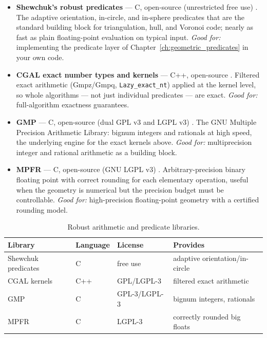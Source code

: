 \begin{itemize}
  \item \textbf{Shewchuk's robust predicates} --- C, open-source
    (unrestricted free use) \cite{shewchuk1997}. The adaptive
    orientation, in-circle, and in-sphere predicates that are the
    standard building block for triangulation, hull, and Voronoi code;
    nearly as fast as plain floating-point evaluation on typical input.
    \emph{Good for:} implementing the predicate layer of
    Chapter~\ref{ch:geometric_predicates} in your own code.
  \item \textbf{CGAL exact number types and kernels} --- C++, open-source
    \cite{cgalmanual}. Filtered exact arithmetic (Gmpz/Gmpq,
    \texttt{Lazy\_exact\_nt}) applied at the kernel level, so whole
    algorithms --- not just individual predicates --- are exact.
    \emph{Good for:} full-algorithm exactness guarantees.
  \item \textbf{GMP} --- C, open-source (dual GPL v3 and LGPL v3)
    \cite{gmp}. The GNU Multiple Precision Arithmetic Library: bignum
    integers and rationals at high speed, the underlying engine for the
    exact kernels above. \emph{Good for:} multiprecision integer and
    rational arithmetic as a building block.
  \item \textbf{MPFR} --- C, open-source (GNU LGPL v3) \cite{mpfr}.
    Arbitrary-precision binary floating point with correct rounding for
    each elementary operation, useful when the geometry is numerical but
    the precision budget must be controllable. \emph{Good for:}
    high-precision floating-point geometry with a certified rounding
    model.
\end{itemize}

\begin{table}[ht]
\centering
\begin{tabular}{llll}
\hline
\textbf{Library} & \textbf{Language} & \textbf{License} & \textbf{Provides} \\
\hline
Shewchuk predicates & C          & free use & adaptive orientation/in-circle \\
CGAL kernels        & C++        & GPL/LGPL-3 & filtered exact arithmetic \\
GMP                 & C          & GPL-3/LGPL-3 & bignum integers, rationals \\
MPFR                & C          & LGPL-3 & correctly rounded big floats \\
\hline
\end{tabular}
\caption{Robust arithmetic and predicate libraries.}
\label{tbl:appsoft_robust}
\end{table}

